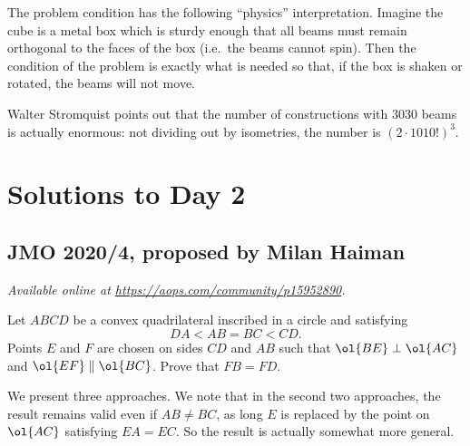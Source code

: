 \documentclass[11pt]{scrartcl}
\begin{document}
\begin{remark*}
  The problem condition has the following ``physics'' interpretation.
  Imagine the cube is a metal box which is sturdy enough that
  all beams must remain orthogonal to the faces of the box
  (i.e.\ the beams cannot spin).
  Then the condition of the problem is exactly what is needed so that,
  if the box is shaken or rotated, the beams will not move.
\end{remark*}

\begin{remark*}
  Walter Stromquist points out that the number of constructions
  with $3030$ beams is actually enormous:
  not dividing out by isometries,
  the number is $(2 \cdot 1010!)^3$.
\end{remark*}
\pagebreak

\section{Solutions to Day 2}
\subsection{JMO 2020/4, proposed by Milan Haiman}
\textsl{Available online at \url{https://aops.com/community/p15952890}.}
\begin{mdframed}[style=mdpurplebox,frametitle={Problem statement}]
Let $ABCD$ be a convex quadrilateral inscribed in a circle and satisfying
\[ DA < AB = BC < CD. \]
Points $E$ and $F$ are chosen on sides $CD$ and $AB$
such that $\ol{BE} \perp \ol{AC}$ and $\ol{EF} \parallel \ol{BC}$.
Prove that $FB=FD$.
\end{mdframed}
We present three approaches.
We note that in the second two approaches,
the result remains valid even if $AB \neq BC$,
as long $E$ is replaced by the point on $\ol{AC}$
satisfying $EA = EC$.
So the result is actually somewhat more general.
\end{document}
